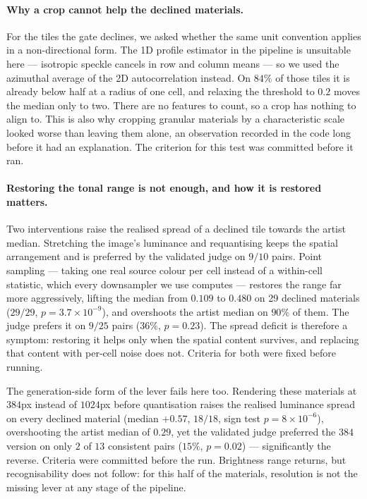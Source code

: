 \documentclass{article}
\begin{document}
\paragraph{Why a crop cannot help the declined materials.} For the tiles the
gate declines, we asked whether the same unit convention applies in a
non-directional form. The 1D profile estimator in the pipeline is unsuitable
here --- isotropic speckle cancels in row and column means --- so we used the
azimuthal average of the 2D autocorrelation instead. On $84\%$ of those tiles
it is already below half at a radius of one cell, and relaxing the threshold
to $0.2$ moves the median only to two. There are no features to count, so a
crop has nothing to align to. This is also why cropping granular materials by
a characteristic scale looked worse than leaving them alone, an observation
recorded in the code long before it had an explanation. The criterion for this
test was committed before it ran.

\paragraph{Restoring the tonal range is not enough, and how it is restored
matters.} Two interventions raise the realised spread of a declined tile
towards the artist median. Stretching the image's luminance and requantising
keeps the spatial arrangement and is preferred by the validated judge on
$9/10$ pairs. Point sampling --- taking one real source colour per cell
instead of a within-cell statistic, which every downsampler we use computes
--- restores the range far more aggressively, lifting the median from $0.109$
to $0.480$ on 29 declined materials ($29/29$, $p{=}3.7\times10^{-9}$), and
overshoots the artist median on $90\%$ of them. The judge prefers it on
$9/25$ pairs ($36\%$, $p{=}0.23$). The spread deficit is therefore a symptom:
restoring it helps only when the spatial content survives, and replacing that
content with per-cell noise does not. Criteria for both were fixed before
running.

The generation-side form of the lever fails here too. Rendering these
materials at $384$px instead of $1024$px before quantisation raises the
realised luminance spread on every declined material (median $+0.57$,
$18/18$, sign test $p=8\times 10^{-6}$), overshooting the artist median of
$0.29$, yet the validated judge preferred the $384$ version on only $2$ of
$13$ consistent pairs ($15\%$, $p=0.02$) --- significantly the reverse.
Criteria were committed before the run. Brightness range returns, but
recognisability does not follow: for this half of the materials, resolution
is not the missing lever at any stage of the pipeline.
\end{document}
